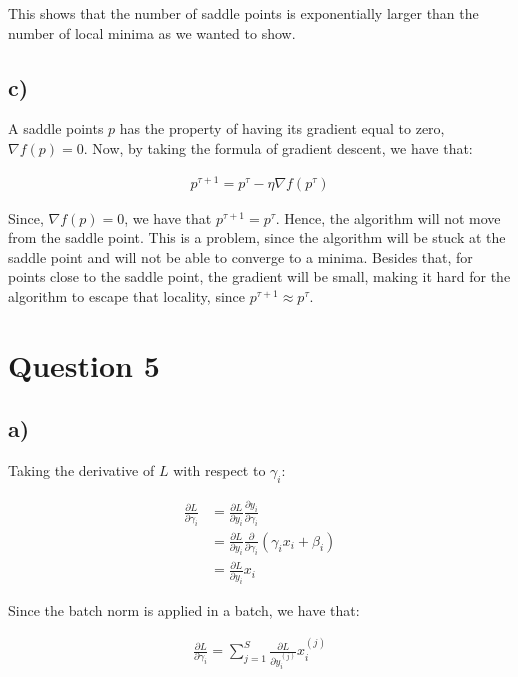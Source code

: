 \documentclass{article}
\begin{document}
This shows that the number of saddle points is exponentially larger than the number of local minima as
we wanted to show.

\subsection*{c)}

A saddle points $p$ has the property of having its gradient equal to zero, $\nabla f(p) = 0$.
Now, by taking the formula of gradient descent, we have that:

\begin{align*}
    p^{\tau+1} = p^{\tau} - \eta  \nabla f(p^\tau)
\end{align*}

Since, $\nabla f(p) = 0$, we have that $p^{\tau+1} = p^{\tau}$. Hence, the algorithm will not move from the saddle point.
This is a problem, since the algorithm will be stuck at the saddle point and will not be able to converge to a minima.
Besides that, for points close to the saddle point, the gradient will be small, making it hard for the algorithm to escape
that locality, since $p^{\tau+1} \approx p^{\tau}$.


\newpage
\section*{Question 5}

\subsection*{a)}

Taking the derivative of $L$ with respect to $\gamma_i$:

\begin{align*}
    \frac{\partial L}{\partial \gamma_i} &= \frac{\partial L}{\partial y_i} \frac{\partial y_i}{\partial \gamma_i} \\
    &= \frac{\partial L}{\partial y_i} \frac{\partial}{\partial \gamma_i} \left( \gamma_i x_i + \beta_i \right) \\
    &= \frac{\partial L}{\partial y_i} x_i
\end{align*}

Since the batch norm is applied in a batch, we have that: 

\begin{align*}
    \frac{\partial L}{\partial \gamma_i} = \sum_{j=1}^{S} \frac{\partial L}{\partial y_i^{(j)}} x_i^{(j)}
\end{align*}
\end{document}
